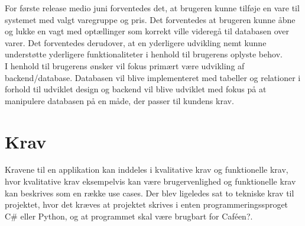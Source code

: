\documentclass[]{article}
\begin{document}
\indent For første release medio juni forventedes det, at brugeren kunne tilføje en vare til systemet med valgt varegruppe og pris. Det forventedes at brugeren kunne åbne og lukke en vagt med optællinger som korrekt ville videregå til databasen over varer. Det forventedes derudover, at en yderligere udvikling nemt kunne understøtte yderligere funktionaliteter i henhold til brugerens oplyste behov. \\
\indent I henhold til brugerens ønsker vil fokus primært være udvikling af backend/database. Databasen vil blive implementeret med tabeller og relationer i forhold til udviklet design og backend vil blive udviklet med fokus på at manipulere databasen på en måde, der passer til kundens krav.

\pagebreak[3]

\section{Krav} \label{Krav}
Kravene til en applikation kan inddeles i kvalitative krav og funktionelle krav, hvor kvalitative krav eksempelvis kan være brugervenlighed og funktionelle krav kan beskrives som en række use cases.
Der blev ligeledes sat to tekniske krav til projektet, hvor det kræves at projektet skrives i enten programmeringssproget C\# eller Python, og at programmet skal være brugbart for Caféen?.
\end{document}
